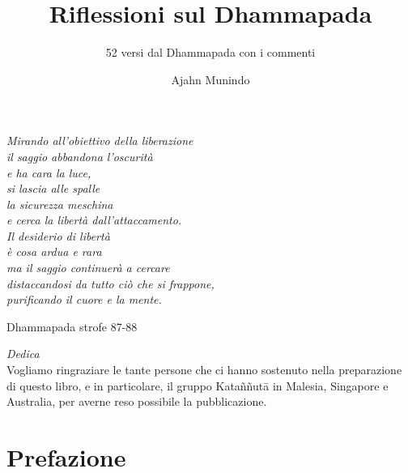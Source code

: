 \documentclass{aruno-gist}
\title{Riflessioni sul Dhammapada}
\subtitle{52 versi dal Dhammapada con i commenti}
\author{Ajahn Munindo}
\date{}
\begin{document}
\thispagestyle{empty}
\mbox{}
\pagecolor[gray]{0.7}
\newpage
\thispagestyle{empty}
\pagecolor{white}
\mbox{}
\newpage


\frontmatter*
\pagestyle{empty}

\midsloppy

\cleartorecto
\begin{quotepage}{60mm}
\centering
\itshape
Mirando all'obiettivo della liberazione\\
il saggio abbandona l'oscurit\`{a}\\
e ha cara la luce,\\
si lascia alle spalle\\
la sicurezza meschina\\
e cerca la libert\`{a} dall'attaccamento.\\
Il desiderio di libert\`{a}\\
\`{e} cosa ardua e rara\\
ma il saggio continuer\`{a} a cercare\\
distaccandosi da tutto ci\`{o} che si frappone,\\
purificando il cuore e la mente.

{\smaller Dhammapada strofe 87-88}
\end{quotepage}

\cleartoverso
\begin{quotepage}{80mm}
\centering
\textit{Dedica}\\[0.4\baselineskip]
Vogliamo ringraziare le tante persone che ci hanno sostenuto nella preparazione di questo libro, e in particolare, il gruppo Kataññutā in Malesia, Singapore e Australia, per averne reso possibile la pubblicazione.

\end{quotepage}

\cleartorecto
\thispagestyle{empty}


\cleartoverso
\thispagestyle{empty}



\chapter{Prefazione}



\mainmatter*

\cleartorecto
\thispagestyle{empty}
{\centering

\vspace*{0.6\textheight}
{\chapNameFont\LARGE\color{chaptitle}}

}
\end{document}
